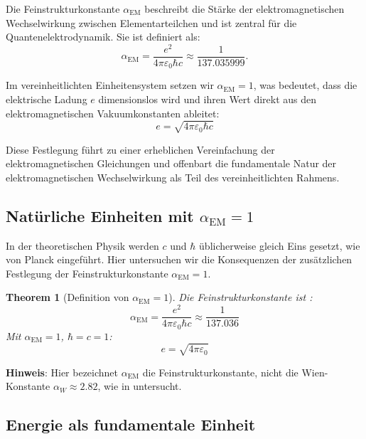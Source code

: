 \documentclass[12pt,a4paper]{article}
\newcommand{\alphaEM}{\alpha_{\text{EM}}}
\newtheorem{theorem}{Theorem}[section]
\begin{document}
	Die Feinstrukturkonstante \(\alphaEM\) beschreibt die Stärke der elektromagnetischen Wechselwirkung zwischen Elementarteilchen und ist zentral für die Quantenelektrodynamik. Sie ist definiert als:
	\begin{equation}
		\label{eq:alpha_em_def}
		\alphaEM = \frac{e^2}{4\pi \varepsilon_0 \hbar c} \approx \frac{1}{137.035999}.
	\end{equation}
	
	Im vereinheitlichten Einheitensystem setzen wir \(\alphaEM = 1\), was bedeutet, dass die elektrische Ladung \(e\) dimensionslos wird und ihren Wert direkt aus den elektromagnetischen Vakuumkonstanten ableitet:
	\begin{equation}
		\label{eq:charge_relation}
		e = \sqrt{4\pi \varepsilon_0 \hbar c}
	\end{equation}
	
	Diese Festlegung führt zu einer erheblichen Vereinfachung der elektromagnetischen Gleichungen und offenbart die fundamentale Natur der elektromagnetischen Wechselwirkung als Teil des vereinheitlichten Rahmens.
	
	\subsection{Natürliche Einheiten mit \(\alphaEM = 1\)}
	\label{subsec:alpha_one}
	
	In der theoretischen Physik werden \(c\) und \(\hbar\) üblicherweise gleich Eins gesetzt, wie von Planck \cite{planck1899} eingeführt. Hier untersuchen wir die Konsequenzen der zusätzlichen Festlegung der Feinstrukturkonstante \(\alphaEM = 1\).
	
	\begin{theorem}[Definition von \(\alphaEM = 1\)]
		Die Feinstrukturkonstante ist \cite{Feynman1985}:
		\begin{equation}
			\alphaEM = \frac{e^2}{4\pi\varepsilon_0 \hbar c} \approx \frac{1}{137.036}
		\end{equation}
		Mit \(\alphaEM = 1\), \(\hbar = c = 1\):
		\begin{equation}
			e = \sqrt{4\pi\varepsilon_0}
		\end{equation}
	\end{theorem}
	
	\textbf{Hinweis}: Hier bezeichnet \(\alphaEM\) die Feinstrukturkonstante, nicht die Wien-Konstante \(\alpha_W \approx 2.82\), wie in \cite{pascher_temp_2025} untersucht.
	
	\subsection{Energie als fundamentale Einheit}
	\label{subsec:energy_fundamental}
	
\end{document}

